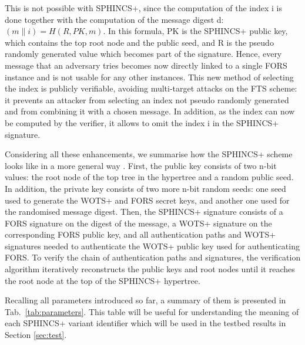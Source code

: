 \documentclass[a4paper,12pt]{article}
\def\mytab#1{Tab.~#1\xspace}
\begin{document}
\begin{itemize}
	This is not possible with SPHINCS+, since the computation of the index i is done together with the computation of the message digest d: $( m \parallel i ) = H (R, PK, m)$. In this formula, PK is the SPHINCS+ public key, which contains the top root node and the public seed, and R is the pseudo randomly generated value which becomes part of the signature. Hence, every message that an adversary tries becomes now directly linked to a single FORS instance and is not usable for any other instances.
	This new method of selecting the index is publicly verifiable, avoiding multi-target attacks on the FTS scheme: it prevents an attacker from selecting an index not pseudo randomly generated and from combining it with a chosen message.
	In addition, as the index can now be computed by the verifier, it allows to omit the index i in the SPHINCS+ signature.
\end{itemize}

Considering all these enhancements, we summarise how the SPHINCS+ scheme looks like in a more general way \cite{3_SPHINCS_secondpaper}.
First, the public key consists of two n-bit values: the root node of the top tree in the hypertree and a random public seed. In addition, the private key consists of two more n-bit random seeds: one seed used to generate the WOTS+ and FORS secret keys, and another one used for the randomised message digest.
Then, the SPHINCS+ signature consists of a FORS signature on the digest of the message, a WOTS+ signature on the corresponding FORS public key, and all authentication paths and WOTS+ signatures needed to authenticate the WOTS+ public key used for authenticating FORS.
To verify the chain of authentication paths and signatures, the verification algorithm iteratively reconstructs the public keys and root nodes until it reaches the root node at the top of the SPHINCS+ hypertree.

Recalling all parameters introduced so far, a summary of them is presented in \mytab{\ref{tab:parameters}}. This table will be useful for understanding the meaning of each SPHINCS+ variant identifier which will be used in the testbed results in Section \ref{sec:test}.
\end{document}
